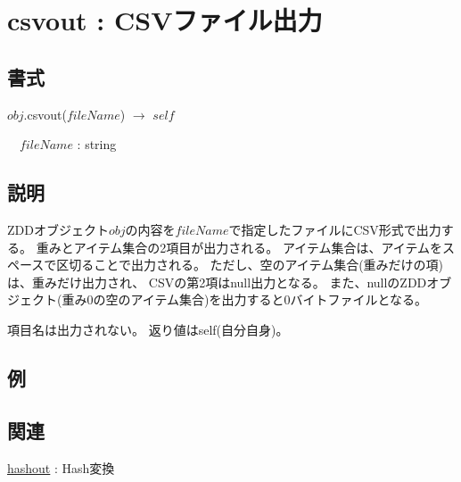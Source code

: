 
\section{csvout : CSVファイル出力\label{sect:csvout}}
\subsection*{書式}
$obj$.csvout($fileName$) $\rightarrow$ $self$ 

~~$fileName$ : string

\subsection*{説明}
ZDDオブジェクト$obj$の内容を$fileName$で指定したファイルにCSV形式で出力する。
重みとアイテム集合の2項目が出力される。
アイテム集合は、アイテムをスペースで区切ることで出力される。
ただし、空のアイテム集合(重みだけの項)は、重みだけ出力され、
CSVの第2項はnull出力となる。
また、nullのZDDオブジェクト(重み0の空のアイテム集合)を出力すると0バイトファイルとなる。

項目名は出力されない。
返り値はself(自分自身)。

\subsection*{例}


\subsection*{関連}
\hyperref[sect:hashout]{hashout} : Hash変換

